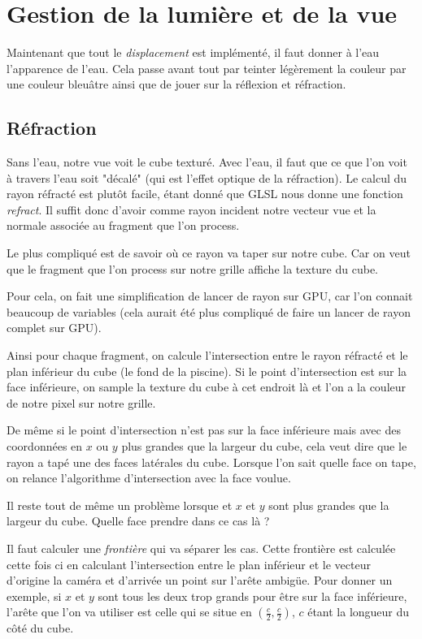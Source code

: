 \documentclass[a4paper,11pt,leqno]{article}
\begin{document}
\section{Gestion de la lumière et de la vue}

Maintenant que tout le \emph{displacement} est implémenté, il faut donner à l'eau l'apparence de l'eau. Cela passe avant tout par teinter légèrement la couleur par une couleur bleuâtre ainsi que de jouer sur la réflexion et réfraction.

\subsection{Réfraction}

Sans l'eau, notre vue voit le cube texturé. Avec l'eau, il faut que ce que l'on voit à travers l'eau soit "décalé" (qui est l'effet optique de la réfraction). Le calcul du rayon réfracté est plutôt facile, étant donné que GLSL nous donne une fonction \emph{refract}. Il suffit donc d'avoir comme rayon incident notre vecteur vue et la normale associée au fragment que l'on process.

Le plus compliqué est de savoir où ce rayon va taper sur notre cube. Car on veut que le fragment que l'on process sur notre grille affiche la texture du cube.

Pour cela, on fait une simplification de lancer de rayon sur GPU, car l'on connait beaucoup de variables (cela aurait été plus compliqué de faire un lancer de rayon complet sur GPU).

Ainsi pour chaque fragment, on calcule l'intersection entre le rayon réfracté et le plan inférieur du cube (le fond de la piscine). Si le point d'intersection est sur la face inférieure, on sample la texture du cube à cet endroit là et l'on a la couleur de notre pixel sur notre grille.

De même si le point d'intersection n'est pas sur la face inférieure mais avec des coordonnées en $x$ ou $y$ plus grandes que la largeur du cube, cela veut dire que le rayon a tapé une des faces latérales du cube. Lorsque l'on sait quelle face on tape, on relance l'algorithme d'intersection avec la face voulue.

Il reste tout de même un problème lorsque et $x$ et $y$ sont plus grandes que la largeur du cube. Quelle face prendre dans ce cas là ?

Il faut calculer une \emph{frontière} qui va séparer les cas. Cette frontière est calculée cette fois ci en calculant l'intersection entre le plan inférieur et le vecteur d'origine la caméra et d'arrivée un point sur l'arête ambigüe. Pour donner un exemple, si $x$ et $y$ sont tous les deux trop grands pour être sur la face inférieure, l'arête que l'on va utiliser est celle qui se situe en $(\frac{c}{2}, \frac{c}{2})$, $c$ étant la longueur du côté du cube.
\end{document}
